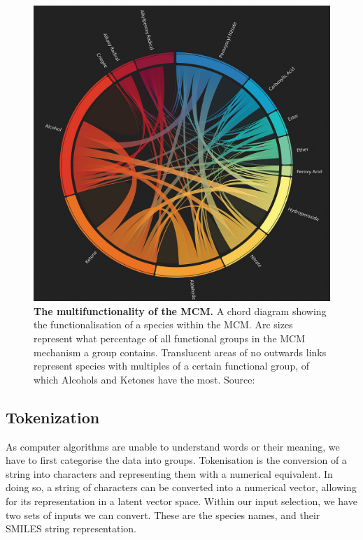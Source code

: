 \begin{figure}[H]
    \centering
    \includegraphics[width=\textwidth]{4fig/coverfig.jpg}
    \caption{\textbf{The multifunctionality of the MCM.} A chord diagram showing the functionalisation of a species within the MCM. Arc sizes represent what percentage of all functional groups in the MCM mechanism a group contains. Translucent areas of no outwards links represent species with multiples of a certain functional group, of which Alcohols and Ketones have the most.
    Source: \citep{cover} }
    \label{fig:covermcm}
\end{figure}



\subsection{Tokenization}
As computer algorithms are unable to understand words or their meaning, we have to first categorise the data into groups. Tokenisation is the conversion of a string into characters and representing them with a numerical equivalent. In doing so, a string of characters can be converted into a numerical vector, allowing for its representation in a latent vector space.
Within our input selection, we have two sets of inputs we can convert. These are the species names, and their SMILES string representation.



